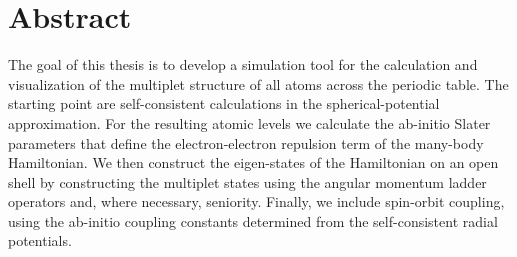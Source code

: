 \chapter*{Abstract}

The goal of this thesis is to develop a simulation tool for the calculation
and visualization of the multiplet structure of all atoms across the periodic
table. The starting point are self-consistent calculations in the spherical-potential
approximation. For the resulting atomic levels we calculate the ab-initio
Slater parameters that define the electron-electron repulsion term of the
many-body Hamiltonian. We then construct the eigen-states of the Hamiltonian
on an open shell by constructing the multiplet states using the angular momentum
ladder operators and, where necessary, seniority. Finally, we include spin-orbit
coupling, using the ab-initio coupling constants determined from the self-consistent
radial potentials.
